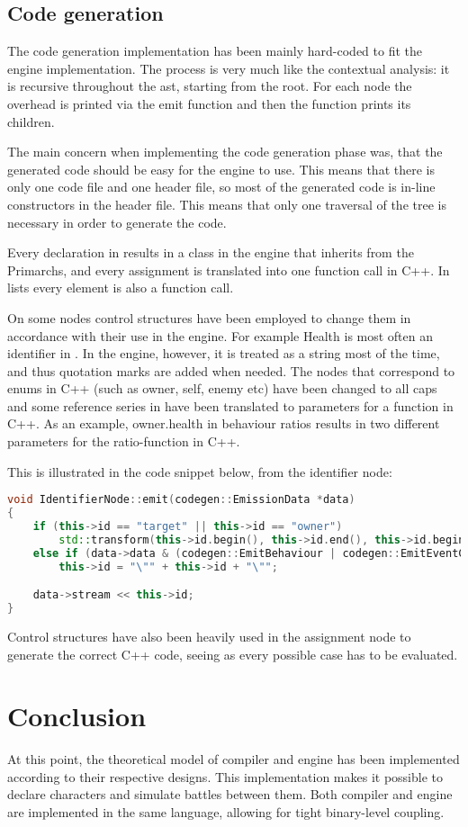 \subsection{Code generation}

The code generation implementation has been mainly hard-coded to fit the engine implementation. The process is very much like the contextual analysis: it is recursive throughout the \ac{ast}, starting from the root. For each node the overhead is printed via the emit function and then the function prints its children. 

The main concern when implementing the code generation phase was, that the generated code should be easy for the engine to use. This means that there is only one code file and one header file, so most of the generated code is in-line constructors in the header file. This means that only one traversal of the tree is necessary in order to generate the code.

Every declaration in \langname{} results in a class in the engine that inherits from the Primarchs, and every assignment is translated into one function call in C++. In lists every element is also a function call.

On some nodes control structures have been employed to change them in accordance with their use in the engine. For example Health is most often an identifier in \langname{}. In the engine, however, it is treated as a string most of the time, and thus quotation marks are added when needed. The nodes that correspond to enums in C++ (such as owner, self, enemy etc) have been changed to all caps and some reference series in \langname{} have been translated to parameters for a function in C++. As an example, owner.health in behaviour ratios results in two different parameters for the ratio-function in C++. 

This is illustrated in the code snippet below, from the identifier node:

\begin{lstlisting}[language = c++]
void IdentifierNode::emit(codegen::EmissionData *data)
{
	if (this->id == "target" || this->id == "owner")
		std::transform(this->id.begin(), this->id.end(), this->id.begin(), (int (*)(int))std::toupper);
	else if (data->data & (codegen::EmitBehaviour | codegen::EmitEventCondition))
		this->id = "\"" + this->id + "\"";

	data->stream << this->id;
}
\end{lstlisting}

Control structures have also been heavily used in the assignment node to generate the correct C++ code, seeing as every possible case has to be evaluated.

\section{Conclusion}
At this point, the theoretical model of \langname{} compiler and engine has been implemented according to their respective designs.
This implementation makes it possible to declare characters and simulate battles between them. Both compiler and engine are implemented in the same language, allowing for tight binary-level coupling.
